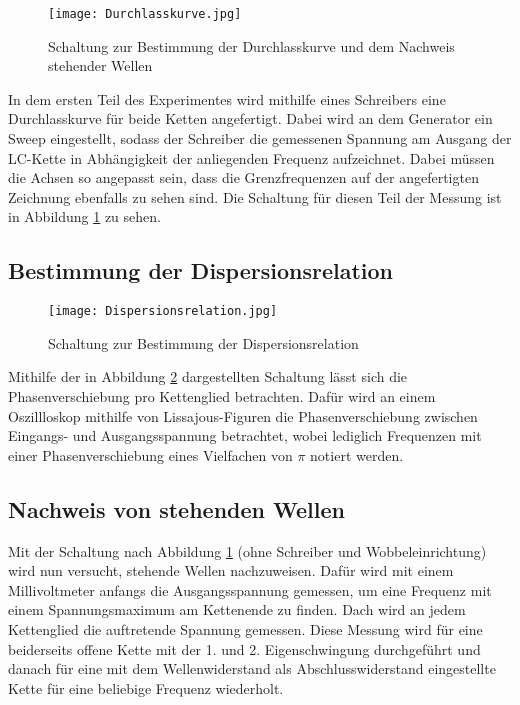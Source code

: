 \begin{figure}
  \texttt{[image: Durchlasskurve.jpg]}
  \caption{Schaltung zur Bestimmung der Durchlasskurve und dem Nachweis stehender Wellen \cite{anleitung01}}
  \label{fig:Durchlasskurve}
\end{figure}

In dem ersten Teil des Experimentes wird mithilfe eines Schreibers eine Durchlasskurve
für beide Ketten angefertigt. Dabei wird an dem Generator ein Sweep eingestellt,
sodass der Schreiber die gemessenen Spannung am Ausgang der LC-Kette in Abhängigkeit
der anliegenden Frequenz aufzeichnet. Dabei müssen die Achsen so angepasst sein,
dass die Grenzfrequenzen auf der angefertigten Zeichnung ebenfalls zu sehen sind.
Die Schaltung für diesen Teil der Messung ist in Abbildung \ref{fig:Durchlasskurve}
zu sehen.


\subsection{Bestimmung der Dispersionsrelation}

\begin{figure}
  \texttt{[image: Dispersionsrelation.jpg]}
  \caption{Schaltung zur Bestimmung der Dispersionsrelation \cite{anleitung01}}
  \label{fig:Dispersion}
\end{figure}

Mithilfe der in Abbildung \ref{fig:Dispersion} dargestellten Schaltung lässt sich die Phasenverschiebung
pro Kettenglied betrachten. Dafür wird an einem Oszillloskop mithilfe von Lissajous-Figuren
die Phasenverschiebung zwischen Eingangs- und Ausgangsspannung betrachtet, wobei
lediglich Frequenzen mit einer Phasenverschiebung eines Vielfachen von $\pi$
notiert werden.


\subsection{Nachweis von stehenden Wellen}

Mit der Schaltung nach Abbildung \ref{fig:Durchlasskurve} (ohne Schreiber und Wobbeleinrichtung) wird
nun versucht, stehende Wellen nachzuweisen.
Dafür wird mit einem Millivoltmeter anfangs die Ausgangsspannung gemessen, um eine
Frequenz mit einem Spannungsmaximum am Kettenende zu finden. Dach wird an jedem
Kettenglied die auftretende Spannung gemessen. Diese Messung wird für eine
beiderseits offene Kette mit der 1. und 2. Eigenschwingung durchgeführt und danach
für eine mit dem Wellenwiderstand als Abschlusswiderstand eingestellte Kette
für eine beliebige Frequenz wiederholt.

\newpage



\printbibliography



